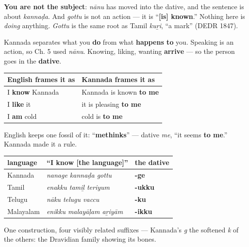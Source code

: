 \textbf{You are not the subject}: \emph{nānu} has moved into the dative, and the sentence is about \emph{kannaḍa}. And \emph{gottu} is not an action — it is \textquotedblleft{}\textbf{{[}is{]} known}.\textquotedblright{} Nothing here is \emph{doing} anything. \emph{Gottu} is the same root as Tamil \emph{kuṟi}, \textquotedblleft{}a mark\textquotedblright{} (DEDR 1847).

\begin{grammarlens}[title={Grammar Lens: Why: things that happen \emph{to} you}]
Kannada separates what you \textbf{do} from what \textbf{happens to} you. Speaking is an action, so Ch. 5 used \emph{nānu}. Knowing, liking, wanting \textbf{arrive} — so the person goes in the \textbf{dative}.

\noindent
\begin{tabularx}{\linewidth}{@{}>{\raggedright\arraybackslash}X>{\raggedright\arraybackslash}X@{}}
\toprule
\textbf{English frames it as} & \textbf{Kannada frames it as} \\
\midrule
I \textbf{know} Kannada & Kannada is known \textbf{to me} \\
I \textbf{like} it & it is pleasing \textbf{to me} \\
I \textbf{am} cold & cold is \textbf{to me} \\
\bottomrule
\end{tabularx}

English keeps one fossil of it: \textquotedblleft{}\textbf{methinks}\textquotedblright{} — dative \emph{me}, \textquotedblleft{}it seems \textbf{to me}.\textquotedblright{} Kannada made it a rule.
\end{grammarlens}

\begin{grammarlens}[title={Grammar Lens: All four sisters do it}]
\noindent
\begin{tabularx}{\linewidth}{@{}>{\raggedright\arraybackslash}X>{\raggedright\arraybackslash}X>{\raggedright\arraybackslash}X@{}}
\toprule
\textbf{language} & \textbf{\textquotedblleft{}I know {[}the language{]}\textquotedblright{}} & \textbf{the dative} \\
\midrule
Kannada & \emph{nanage kannaḍa gottu} & \textbf{-ge} \\
Tamil & \emph{enakku tamiḻ teriyum} & \textbf{-ukku} \\
Telugu & \emph{nāku telugu vaccu} & \textbf{-ku} \\
Malayalam & \emph{enikku malayāḷam aṟiyām} & \textbf{-ikku} \\
\bottomrule
\end{tabularx}

One construction, four visibly related suffixes — Kannada's \emph{g} the softened \emph{k} of the others: the Dravidian family showing its bones.
\end{grammarlens}

